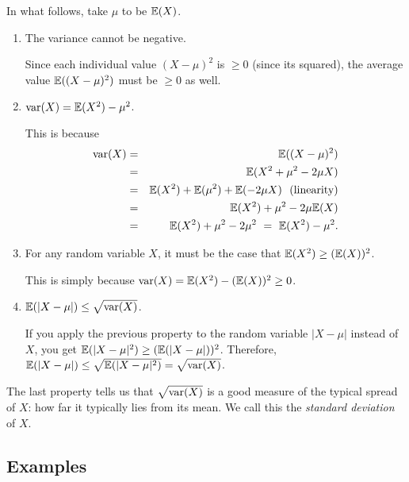 In what follows, take $\mu$ to be $\mathbb{E}(X)$.
\begin{enumerate}
\item The variance cannot be negative.

Since each individual value $(X - \mu)^2$ is $\geq 0$ (since its squared), the 
average value $\mathbb{E}((X - \mu)^2)$ must be $\geq 0$ as well.

\item $\mbox{\rm var}(X) = \mathbb{E}(X^2) - \mu^2$.

This is because
\begin{eqnarray*}
\var(X)  & = & \E((X - \mu)^2) \\
         & = & \E(X^2 + \mu^2 - 2\mu X) \\
         & = & \E(X^2) + \E(\mu^2) + \E(-2 \mu X) \ \ \mbox{(linearity)} \\
         & = & \E(X^2) + \mu^2 - 2 \mu \E(X) \\
         & = & \E(X^2) + \mu^2 - 2 \mu^2 \ = \ \E(X^2) - \mu^2.
\end{eqnarray*}

\item For any random variable $X$, it must be the case that $\mathbb{E}(X^2) \geq (\mathbb{E}(X))^2$.

This is simply because $\mbox{\rm var}(X) = \mathbb{E}(X^2) - (\mathbb{E}(X))^2 \geq 0$.

\item $\mathbb{E}(|X - \mu|) \leq \sqrt{\mbox{\rm var}(X)}$.

If you apply the previous property to the random variable $|X - \mu|$ instead of $X$,
you get $\mathbb{E}(|X - \mu|^2) \geq (\mathbb{E}(|X - \mu|))^2$. Therefore,
$\mathbb{E}(|X - \mu|) \leq \sqrt{\mathbb{E}(|X - \mu|^2)} = \sqrt{\mbox{\rm var}(X)}$. 
\end{enumerate}

The last property tells us that $\sqrt{\mbox{\rm var}(X)}$ is a good measure of the typical spread of
$X$: how far it typically lies from its mean. We call this the {\it standard deviation} of 
$X$.

\subsection{Examples}


